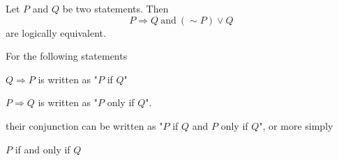 \begin{thm}
     Let $P$ and $Q$ be two statements. Then
     \begin{equation*}
        P \Rightarrow Q \:\text{and}\: (\sim P) \vee Q
     \end{equation*}
     are logically equivalent.
\end{thm}
For the following statements
\begin{center}
     $Q \Rightarrow P$ is written as "$P$ if $Q$"
\end{center}
\begin{center}
    $P \Rightarrow Q$ is written as "$P$ only if $Q$".
\end{center}
their conjunction can be written as "$P$ if $Q$ and $P$ only if
 $Q$", or more simply
 \begin{center}
    $P$ if and only if $Q$
\end{center}

